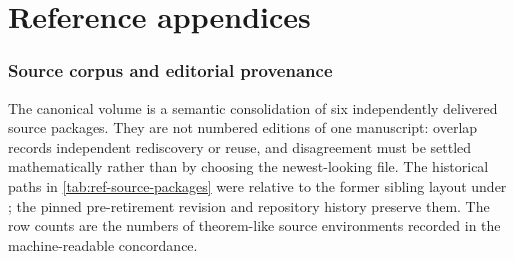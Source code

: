 \part{Reference appendices}
\label{part:ref-appendices}

\section{Source corpus and editorial provenance}
\label{sec:ref-source-provenance}

The canonical volume is a semantic consolidation of six independently
delivered source packages.  They are not numbered editions of one manuscript:
overlap records independent rediscovery or reuse, and disagreement must be
settled mathematically rather than by choosing the newest-looking file.  The
historical paths in \cref{tab:ref-source-packages} were relative to the former
sibling layout under ; the pinned pre-retirement
revision and repository history preserve them.  The row counts are the
numbers of theorem-like source environments recorded in the machine-readable
concordance.

